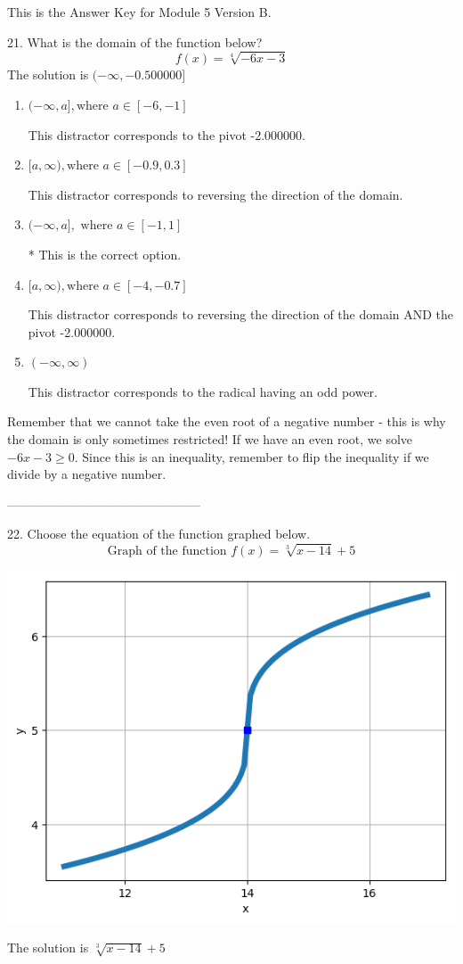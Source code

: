 \documentclass{article}[10pt]
\begin{document}
This is the Answer Key for Module 5 Version B.

21. What is the domain of the function below?
$$ f(x) = \sqrt[4]{-6 x - 3} $$ 
The solution is $ (-\infty, -0.500000] $ 

\begin{enumerate}[label=\Alph*.] 
\item $ (-\infty, a], \text{where } a \in [-6, -1] $ 

 This distractor corresponds to the pivot -2.000000. 
\item $ [a, \infty), \text{where } a \in [-0.9, 0.3] $ 

 This distractor corresponds to reversing the direction of the domain. 
\item $ (-\infty, a], \text{ where } a \in [-1, 1] $ 

 * This is the correct option. 
\item $ [a, \infty), \text{where } a \in [-4, -0.7] $ 

 This distractor corresponds to reversing the direction of the domain AND the pivot -2.000000. 
\item $ (-\infty, \infty) $ 

 This distractor corresponds to the radical having an odd power. 
\end{enumerate} 
 
Remember that we cannot take the even root of a negative number - this is why the domain is only sometimes restricted! If we have an even root, we solve $-6 x - 3 \geq 0$. Since this is an inequality, remember to flip the inequality if we divide by a negative number.

-----------------------------------------------

22. Choose the equation of the function graphed below.
$$ \text{Graph of the function } f(x) = \sqrt[3]{x - 14} + 5 $$ 
\begin{center}\includegraphics[scale=0.5]{../Figures/question22B.png}\end{center}The solution is $ \sqrt[3]{x - 14} + 5 $ 
\end{document}
